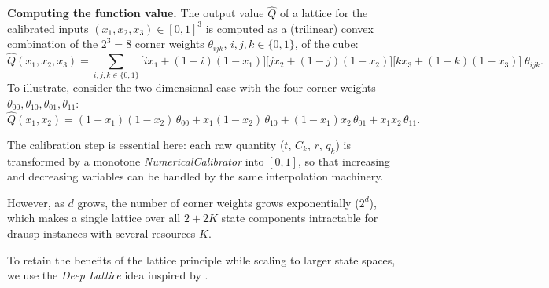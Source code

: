 \textbf{Computing the function value.} The output value $\hat{Q}$ of a lattice for the calibrated inputs
$(x_1,x_2,x_3) \in [0,1]^3$ is computed as a (trilinear) convex combination of the $2^3=8$ corner weights $\theta_{ijk}$, $i,j,k \in \{0,1\}$, of the cube:
\begin{equation*}
  \label{eq:trilinear}
  \hat{Q}(x_1, x_2, x_3) = \sum_{i,j,k \in \{0,1\}} 
    \Big[ i x_1 + (1-i)(1-x_1) \Big] 
    \Big[ j x_2 + (1-j)(1-x_2) \Big] 
    \Big[ k x_3 + (1-k)(1-x_3) \Big] \; \theta_{ijk}.
\end{equation*}
To illustrate, consider the two-dimensional case  with the four corner weights $\theta_{00}, \theta_{10}, \theta_{01}, \theta_{11}$:
\begin{equation*}
  \hat{Q}(x_1, x_2) = (1-x_1)(1-x_2)\,\theta_{00} + x_1(1-x_2)\,\theta_{10} + (1-x_1)x_2\,\theta_{01} + x_1 x_2\,\theta_{11}.
\end{equation*}
\vspace{0.5cm}

The calibration step is essential here: each raw quantity ($t$, $C_k$, $r$, $q_k$) is transformed by a monotone \textit{NumericalCalibrator} into $[0,1]$, so that increasing and decreasing variables can be handled by the same interpolation machinery.

However, as $d$ grows, the number of corner weights grows exponentially ($2^d$), which makes a single lattice over all $2+2K$ state components intractable for \ac{drausp} instances with several resources $K$.

To retain the benefits of the lattice principle while scaling to larger state spaces, we use the \emph{Deep Lattice} idea inspired by \textcite{you2017}.

